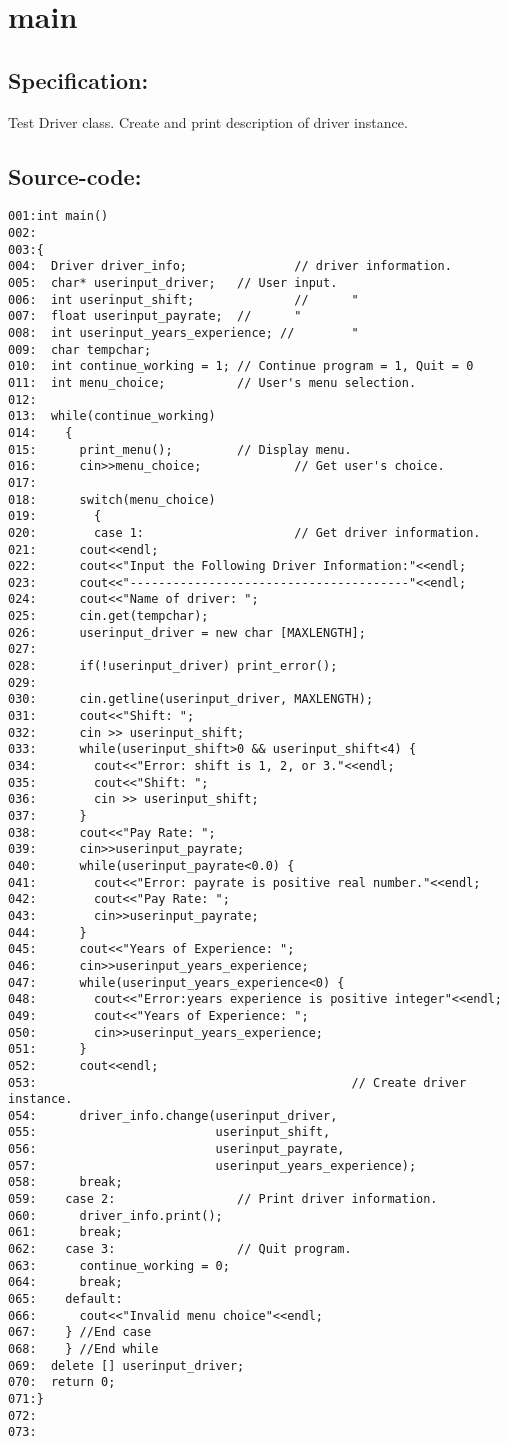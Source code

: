 \section{main}
\subsection*{Specification:}
Test Driver class. Create and print description of 
   driver instance.
\subsection*{Source-code:}
\begin{verbatim}
001:int main()
002:
003:{
004:  Driver driver_info;               // driver information.
005:  char* userinput_driver;   // User input.
006:  int userinput_shift;              //      "
007:  float userinput_payrate;  //      "
008:  int userinput_years_experience; //        "
009:  char tempchar;
010:  int continue_working = 1; // Continue program = 1, Quit = 0
011:  int menu_choice;          // User's menu selection.
012:
013:  while(continue_working)
014:    {
015:      print_menu();         // Display menu.
016:      cin>>menu_choice;             // Get user's choice.
017:
018:      switch(menu_choice)
019:        {
020:        case 1:                     // Get driver information.
021:      cout<<endl;
022:      cout<<"Input the Following Driver Information:"<<endl;
023:      cout<<"---------------------------------------"<<endl;
024:      cout<<"Name of driver: ";
025:      cin.get(tempchar);
026:      userinput_driver = new char [MAXLENGTH];
027:      
028:      if(!userinput_driver) print_error();
029:      
030:      cin.getline(userinput_driver, MAXLENGTH);
031:      cout<<"Shift: ";
032:      cin >> userinput_shift;
033:      while(userinput_shift>0 && userinput_shift<4) {
034:        cout<<"Error: shift is 1, 2, or 3."<<endl;
035:        cout<<"Shift: ";
036:        cin >> userinput_shift;
037:      }
038:      cout<<"Pay Rate: ";
039:      cin>>userinput_payrate;
040:      while(userinput_payrate<0.0) {
041:        cout<<"Error: payrate is positive real number."<<endl;
042:        cout<<"Pay Rate: ";
043:        cin>>userinput_payrate;
044:      }
045:      cout<<"Years of Experience: ";
046:      cin>>userinput_years_experience;
047:      while(userinput_years_experience<0) {
048:        cout<<"Error:years experience is positive integer"<<endl;
049:        cout<<"Years of Experience: ";
050:        cin>>userinput_years_experience;
051:      }
052:      cout<<endl;
053:                                            // Create driver instance.
054:      driver_info.change(userinput_driver, 
055:                         userinput_shift,
056:                         userinput_payrate, 
057:                         userinput_years_experience);
058:      break;
059:    case 2:                 // Print driver information.
060:      driver_info.print();
061:      break;
062:    case 3:                 // Quit program.
063:      continue_working = 0;
064:      break;
065:    default:
066:      cout<<"Invalid menu choice"<<endl;
067:    } //End case
068:    } //End while
069:  delete [] userinput_driver;
070:  return 0;
071:}
072:
073:
\end{verbatim}

